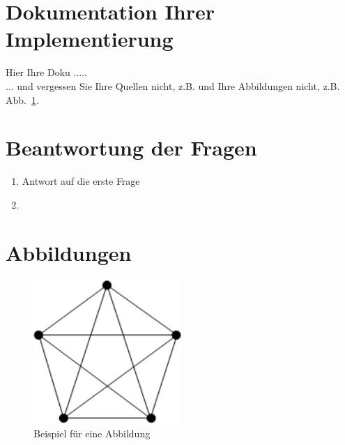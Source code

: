 \documentclass[a4paper]{article}
\begin{document}
	

\newpage
\section{Dokumentation Ihrer Implementierung}

Hier Ihre Doku .....
\\ ... und vergessen Sie Ihre Quellen nicht, z.B. \cite{KN2012} und Ihre Abbildungen nicht, z.B. Abb.~\ref{fig:bild}.
  


\section{Beantwortung der  Fragen}
\begin{enumerate}
						\item Antwort auf die erste Frage
						\item 
					\end{enumerate}


\section*{Abbildungen}


\begin{figure}[h]
	\centering
		\includegraphics[width=0.50\textwidth]{Figs/Bild.png}		
	\caption{Beispiel für eine Abbildung}
	\label{fig:bild}
\end{figure}





%
\end{document}
